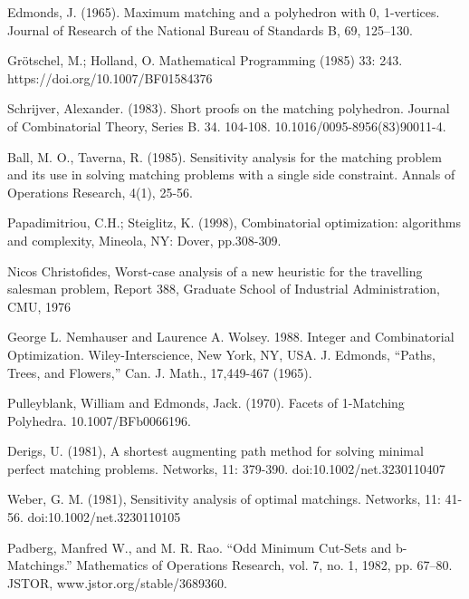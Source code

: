 \documentclass[twoside,a4paper,openright,12pt,tikz]{book}
\begin{document}

\begin{thebibliography}{9}
Edmonds, J. (1965). Maximum matching and a polyhedron with 0, 1-vertices. Journal of Research of the National Bureau of Standards B, 69, 125--130. 

 
Grötschel, M.; Holland, O. Mathematical Programming (1985) 33: 243. https://doi.org/10.1007/BF01584376

Schrijver, Alexander. (1983). Short proofs on the matching polyhedron. Journal of Combinatorial Theory, Series B. 34. 104-108. 10.1016/0095-8956(83)90011-4. 
 
Ball, M. O.,  Taverna, R. (1985). Sensitivity analysis for the matching problem and its use in solving matching problems with a single side constraint. Annals of Operations Research, 4(1), 25-56.

Papadimitriou, C.H.; Steiglitz, K. (1998), Combinatorial optimization: algorithms and complexity, Mineola, NY: Dover, pp.308-309.

Nicos Christofides, Worst-case analysis of a new heuristic for the travelling salesman problem, Report 388, Graduate School of Industrial Administration, CMU, 1976

George L. Nemhauser and Laurence A. Wolsey. 1988. Integer and Combinatorial Optimization. Wiley-Interscience, New York, NY, USA.
J. Edmonds, “Paths, Trees, and Flowers,” Can. J. Math., 17,449-467 (1965).

Pulleyblank, William and Edmonds, Jack. (1970). Facets of 1-Matching Polyhedra. 10.1007/BFb0066196. 

Derigs, U. (1981), A shortest augmenting path method for solving minimal perfect matching problems. Networks, 11: 379-390. doi:10.1002/net.3230110407

Weber, G. M. (1981), Sensitivity analysis of optimal matchings. Networks, 11: 41-56. doi:10.1002/net.3230110105

Padberg, Manfred W., and M. R. Rao. “Odd Minimum Cut-Sets and b-Matchings.” Mathematics of Operations Research, vol. 7, no. 1, 1982, pp. 67–80. JSTOR, www.jstor.org/stable/3689360.
\end{thebibliography}
\end{document}
